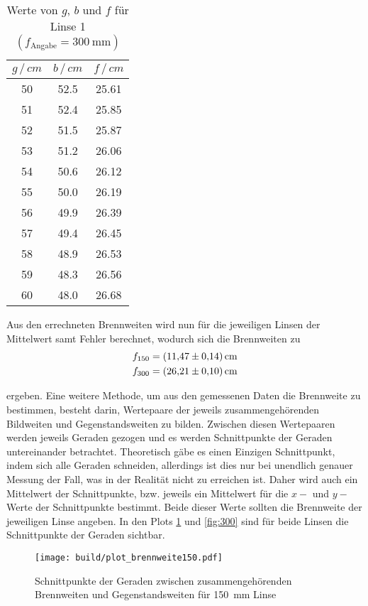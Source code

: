\begin{table}
    \centering
    \caption{Werte von $g$, $b$ und $f$ für Linse 1 $(f_\text{Angabe}=\SI{300}{\mm})$}
    \begin{tabular}{c c c}
    \toprule
    $g\,/\,cm$ & $b\,/\,cm$ & $f\,/\,cm$ \\
    \midrule
    50 & 52.5 & 25.61 \\
    51 & 52.4 & 25.85 \\
    52 & 51.5 & 25.87 \\
    53 & 51.2 & 26.06 \\
    54 & 50.6 & 26.12 \\
    55 & 50.0 & 26.19 \\
    56 & 49.9 & 26.39 \\
    57 & 49.4 & 26.45 \\
    58 & 48.9 & 26.53 \\
    59 & 48.3 & 26.56 \\
    60 & 48.0 & 26.68 \\
    \bottomrule
    \end{tabular}
    \label{tab:f300}
\end{table}

Aus den errechneten Brennweiten wird nun für die jeweiligen Linsen der Mittelwert samt Fehler berechnet, wodurch sich die 
Brennweiten zu
\begin{align*}
    f_{150} &= \SI{11.47+-0.14}{\centi\metre} \\
    f_{300} &= \SI{26.21+-0.10}{\centi\metre} 
\end{align*}

ergeben. Eine weitere Methode, um aus den gemessenen Daten die Brennweite zu bestimmen, besteht darin, Wertepaare der jeweils zusammengehörenden
Bildweiten und Gegenstandsweiten zu bilden. Zwischen diesen Wertepaaren werden jeweils Geraden gezogen und es werden Schnittpunkte
der Geraden untereinander betrachtet. Theoretisch gäbe es einen Einzigen Schnittpunkt, indem sich alle Geraden schneiden, 
allerdings ist dies nur bei unendlich genauer Messung der Fall, was in der Realität nicht zu erreichen ist. Daher wird auch ein 
Mittelwert der Schnittpunkte, bzw. jeweils ein Mittelwert für die $x-$ und $y-$Werte der Schnittpunkte bestimmt. 
Beide dieser Werte sollten die Brennweite der jeweiligen Linse angeben. In den Plots \ref{fig:150} und \ref{fig:300} sind für 
beide Linsen die Schnittpunkte der Geraden sichtbar. 

\begin{figure}
    \centering
    \texttt{[image: build/plot\_brennweite150.pdf]}
    \caption{Schnittpunkte der Geraden zwischen zusammengehörenden Brennweiten und Gegenstandsweiten für \SI{150}{\mm} Linse }
    \label{fig:150}
\end{figure}

